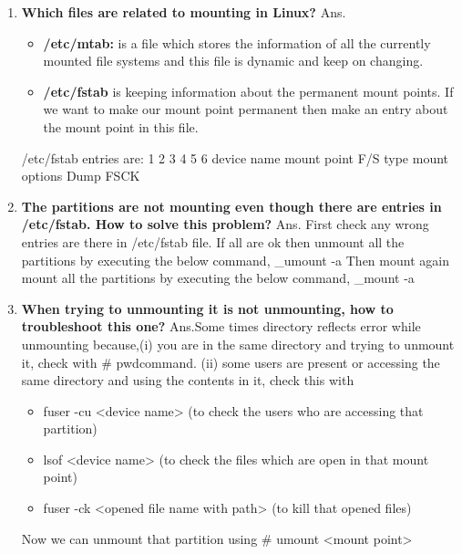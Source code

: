 \begin{enumerate}
\begin{enumerate}
  \bigskip
  \bigskip

  \item \textbf{Which files are related to mounting in Linux?}
  \newline
  Ans.\begin{itemize}
         \item \textbf{/etc/mtab: }is a file which stores the information of all the currently mounted file systems and this file is    dynamic  and keep on changing.
         \item \textbf{/etc/fstab }is keeping information about the permanent mount points. If we want to make our mount point  permanent then make an entry about the mount point in this file.
      \end{itemize}
      /etc/fstab  entries are:
      1		           2	                  	3	            4		     5		 6
      device name     mount point       F/S type	mount options	Dump                    FSCK 


  \bigskip
  \bigskip

  \item \textbf{The partitions are not mounting even though there are entries in /etc/fstab. How to solve this problem?}
  \newline
  Ans. First check any wrong entries are there in /etc/fstab file. If all are ok then unmount all the partitions by executing the below command,
    \_umount    -a Then mount again mount all the partitions by executing the below command,
    \_mount   -a

  \bigskip
  \bigskip

  \item \textbf{When trying to unmounting it is not unmounting, how to troubleshoot this one?}
  \newline
  Ans.Some times directory reflects error while unmounting because,(i) you are in the same directory and trying to unmount it, check with # pwdcommand.
	(ii) some users are present or accessing the same directory and using the contents in it, check this with 
     \begin{itemize}
       \item fuser -cu  <device name>       (to check the users who are accessing that partition)
       \item lsof  <device name>     (to check the files which are open in that mount point)
       \item fuser   -ck   <opened file name with path>      (to kill that opened files)
     \end{itemize}
     Now we can unmount that partition using   # umount     <mount point>
  

\end{enumerate}
\end{enumerate}
